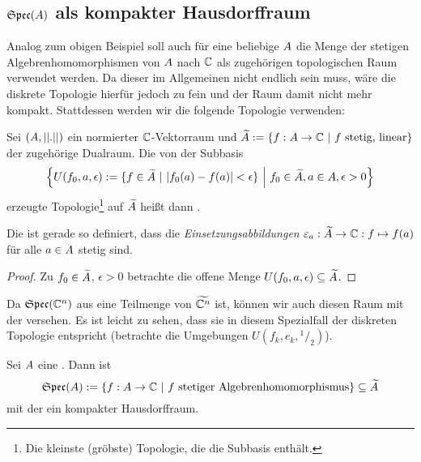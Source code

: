 \subsection{$\mathfrak{Spec}(A)$ als kompakter Hausdorffraum}\label{sec:SpecCA}

Analog zum obigen Beispiel soll auch für eine beliebige \CAlg{} $A$ die Menge der stetigen Algebrenhomomorphismen von $A$ nach $\mathbb{C}$ als zugehörigen topologischen Raum verwendet werden. Da dieser im Allgemeinen nicht endlich sein muss, wäre die diskrete Topologie hierfür jedoch zu fein und der Raum damit nicht mehr kompakt. Stattdessen werden wir die folgende Topologie verwenden:

\begin{defn}[\ssTop]\label{defn:schwachSternTop}
Sei $(A, ||.||)$ ein normierter $\mathbb{C}$-Vektorraum und $\widetilde{A} := \{f: A \to \mathbb{C} ~|~ f \text{ stetig, linear}\}$ der zugehörige Dualraum. Die von der Subbasis
\[ \left\{ U(f_0, a, \epsilon) := \{f \in \widetilde{A} ~|~ |f_0(a)-f(a)| < \epsilon\} ~\middle|~ f_0 \in \widetilde{A}, a \in A, \epsilon > 0 \right\} \]
erzeugte Topologie\footnote{Die kleinste (gröbste) Topologie, die die Subbasis enthält.} auf $\widetilde{A}$ heißt dann \emph{\ssTop}.
\end{defn}

\begin{kor}\label{bem:Einsetz-stetig}
Die \ssTop{} ist gerade so definiert, dass die \emph{Einsetzungsabbildungen} $\varepsilon_a: \widetilde{A} \to \mathbb{C}: f \mapsto f(a)$ für alle $a\in A$ stetig sind.
\end{kor}

\begin{proof}
Zu $f_0 \in \widetilde{A}$, $\epsilon > 0$ betrachte die offene Menge $U(f_0, a, \epsilon) \subseteq \widetilde{A}$.
\end{proof}

\begin{bem}
Da $\mathfrak{Spec}(\mathbb{C}^n)$ aus  eine Teilmenge von $\widetilde{\mathbb{C}^n}$ ist, können wir auch diesen Raum mit der \ssTop{} versehen. Es ist leicht zu sehen, dass sie in diesem Spezialfall der diskreten Topologie entspricht (betrachte die Umgebungen $U(f_k, e_k, {}^1/_2)$).
\end{bem}

\begin{lemma}\label{lemma:MA}
Sei $A$ eine \CAlg. Dann ist
\[\mathfrak{Spec}(A) := \{f: A \to \mathbb{C} ~|~ f \text{ stetiger Algebrenhomomorphismus}\} \subseteq \widetilde{A}\]
mit der \ssTop{} ein kompakter Hausdorffraum.
\end{lemma}

